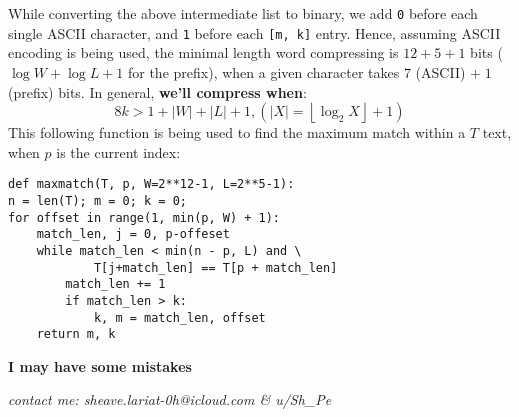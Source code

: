 \documentclass[]{article}
\newcommand\rf    {\right\rfloor}
\newcommand\lf    {\left\lfloor}
\begin{document}
\begin{multicols}{2}
		While converting the above intermediate list to binary, we add \texttt{0} before each single ASCII character, and \texttt{1} before each \texttt{[m, k]} entry. Hence, assuming ASCII encoding is being used, the minimal length word compressing is $12 + 5 + 1$ bits ($\log W + \log L + 1$ for the prefix), when a given character takes $7$ (ASCII) $+ \; 1$ (prefix) bits. In general, \textbf{we'll compress when}: 
		\[ 8k > 1 + |W| + |L| + 1, (|X| = \lf \log_2 X \rf + 1) \]
		This following function is being used to find the maximum match within a $T$ text, when $p$ is the current index: 
		\begin{lstlisting}
def maxmatch(T, p, W=2**12-1, L=2**5-1): 
n = len(T); m = 0; k = 0;
for offset in range(1, min(p, W) + 1):
	match_len, j = 0, p-offeset
	while match_len < min(n - p, L) and \
			T[j+match_len] == T[p + match_len]
		match_len += 1
		if match_len > k: 
			k, m = match_len, offset
	return m, k	\end{lstlisting}
		
	
	
	\end{multicols}
	
	\dotfill
	\begin{center}
		\Large \textbf{I may have some mistakes}
	\end{center}
	\dotfill
	
	{\let\newpage\relax\maketitle}
	\begin{center}
		
		\small\textit{contact me: sheave.lariat-0h@icloud.com \& u/Sh\_Pe}
		
	\end{center}
	\maketitle
	
	
\end{document}
